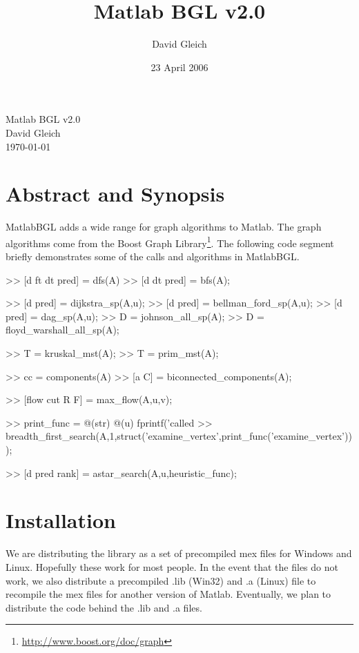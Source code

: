 \documentclass[12pt]{article}
\author{David Gleich}
\title{Matlab BGL v2.0}
\date{23 April 2006}
\begin{document}
{
\setlength{\parskip}{0pt}
\begin{center}
{\Large Matlab BGL v2.0}\\
David Gleich\\
\today
\end{center}
}
\section*{Abstract and Synopsis}

MatlabBGL adds a wide range for graph algorithms to Matlab.  The graph algorithms come from the Boost Graph Library\footnote{\url{http://www.boost.org/doc/graph}}.  The following code segment briefly demonstrates some of the calls and algorithms in MatlabBGL.

\bigskip

\begin{mcode}
>> [d ft dt pred] = dfs(A)
>> [d dt pred] = bfs(A);

>> [d pred] = dijkstra_sp(A,u);
>> [d pred] = bellman_ford_sp(A,u);
>> [d pred] = dag_sp(A,u);
>> D = johnson_all_sp(A);
>> D = floyd_warshall_all_sp(A);

>> T = kruskal_mst(A);
>> T = prim_mst(A);

>> cc = components(A)  
>> [a C] = biconnected_components(A);

>> [flow cut R F] = max_flow(A,u,v);

>> print_func = @(str) @(u) fprintf('called %
>> breadth_first_search(A,1,struct('examine_vertex',print_func('examine_vertex')));

>> [d pred rank] = astar_search(A,u,heuristic_func);
\end{mcode}

\newpage
{
\setlength{\parskip}{0pt}
\tableofcontents
}
\newpage

\section{Installation}
We are distributing the library as a set of precompiled mex files for Windows and Linux.  Hopefully these work for most people.  In the event that the files do not work, we also distribute a precompiled .lib (Win32) and .a (Linux) file to recompile the mex files for another version of Matlab.  Eventually, we plan to distribute the code behind the .lib and .a files.  
\end{document}
